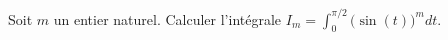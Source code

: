 
\begin{exercice}\label{exoTD6-0004}

	Soit $m$ un entier naturel. Calculer l'intégrale $I_m=\int_0^{\pi/2}\big( \sin(t) \big)^mdt$.

\end{exercice}

